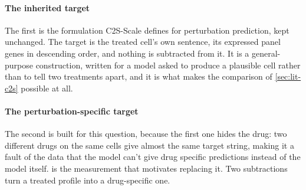\paragraph{The inherited target} The first is the formulation C2S-Scale defines
for perturbation prediction, kept unchanged. The target is the treated cell's
own sentence, its expressed panel genes in descending order, and nothing is
subtracted from it. It is a general-purpose construction, written for a model
asked to produce a plausible cell rather than to tell two treatments apart, and
it is what makes the comparison of \cref{sec:lit-c2s} possible at all.

\paragraph{The perturbation-specific target} The second is built for this
question, because the first one hides the drug: two different drugs on the same cells give
almost the same target string, making it a fault of the data that the model can't give drug specific predictions instead of the model itself.   is the measurement
that motivates replacing it. Two subtractions turn a treated profile into a
drug-specific one.

